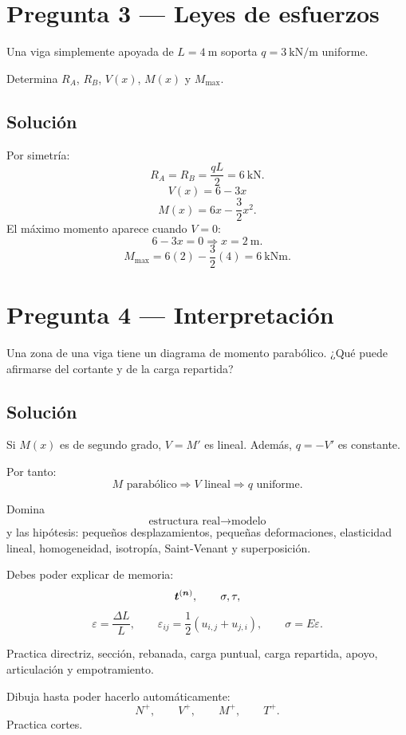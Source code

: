 \section*{Pregunta 3 --- Leyes de esfuerzos}
Una viga simplemente apoyada de $L=\qty{4}{\metre}$ soporta $q=\qty{3}{\kilo\newton\per\metre}$ uniforme.

Determina $R_A$, $R_B$, $V(x)$, $M(x)$ y $M_{\max}$.

\subsection*{Solución}
Por simetría:
\[
R_A=R_B=\frac{qL}{2}=\boxed{\qty{6}{\kilo\newton}}.
\]
\[
\boxed{V(x)=6-3x}
\]
\[
\boxed{M(x)=6x-\frac32x^2}.
\]
El máximo momento aparece cuando $V=0$:
\[
6-3x=0\Longrightarrow x=\qty{2}{\metre}.
\]
\[
M_{\max}=6(2)-\frac32(4)=\boxed{\qty{6}{\kilo\newton\metre}}.
\]

\section*{Pregunta 4 --- Interpretación}
Una zona de una viga tiene un diagrama de momento parabólico. ¿Qué puede afirmarse del cortante y de la carga repartida?

\subsection*{Solución}
Si $M(x)$ es de segundo grado, $V=M'$ es lineal. Además, $q=-V'$ es constante.

Por tanto:
\[
\boxed{M\text{ parabólico}\Rightarrow V\text{ lineal}\Rightarrow q\text{ uniforme}}.
\]


Domina
\[
\text{estructura real}\rightarrow\text{modelo}
\]
y las hipótesis: pequeños desplazamientos, pequeñas deformaciones, elasticidad lineal, homogeneidad, isotropía, Saint-Venant y superposición.

Debes poder explicar de memoria:
\[
\boldsymbol{t}^{(\boldsymbol{n})},\qquad \sigma,\tau,
\]
\[
\varepsilon=\frac{\Delta L}{L},
\qquad
\varepsilon_{ij}=\frac12(u_{i,j}+u_{j,i}),
\qquad
\sigma=E\varepsilon.
\]

Practica directriz, sección, rebanada, carga puntual, carga repartida, apoyo, articulación y empotramiento.

Dibuja hasta poder hacerlo automáticamente:
\[
N^+,\qquad V^+,\qquad M^+,\qquad T^+.
\]
Practica cortes.

